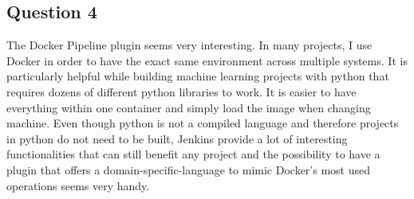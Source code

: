 \subsection*{Question 4}
\noindent The Docker Pipeline plugin seems very interesting. In many projects, I use Docker in order to have the exact same environment across multiple systems. It is particularly helpful while building machine learning projects with python that requires dozens of different python libraries to work. It is easier to have everything within one container and simply load the image when changing machine. Even though python is not a compiled language and therefore projects in python do not need to be built, Jenkins provide a lot of interesting functionalities that can still benefit any project and the possibility to have a plugin that offers a domain-specific-language to mimic Docker's most used operations seems very handy. 

